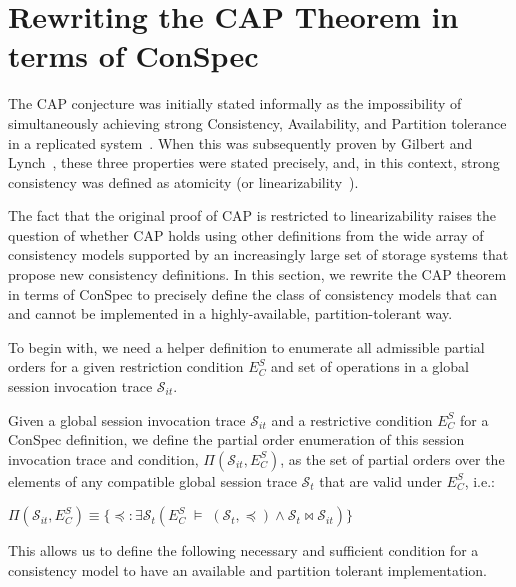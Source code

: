 \documentclass[journal,compsoc]{IEEEtran}
\begin{document}
\section{Rewriting the CAP Theorem in terms of ConSpec}\label{sec:cap}
The CAP conjecture was initially stated informally as the impossibility of simultaneously achieving strong Consistency, Availability, and Partition tolerance in a replicated system~\cite{brew:cap}. When this was subsequently proven by Gilbert and Lynch~\cite{Gilbert:2002:BCF:564585.564601}, these three properties were stated precisely, and, in this context, strong consistency was defined as atomicity (or linearizability~\cite{Herlihy:1990:LCC:78969.78972}).

The fact that the original proof of CAP is restricted to linearizability raises the question of whether CAP holds using other definitions from
 the wide array of consistency models supported by an increasingly large set of storage systems that propose new consistency definitions.
 In this section, we rewrite the CAP theorem in terms of ConSpec to precisely define the class of consistency models that can and cannot be implemented in a highly-available, partition-tolerant way.




To begin with, we need a helper definition to enumerate all admissible partial orders for a given restriction condition $E^S_C$ and set of operations in a global session invocation trace $\mathcal{S}_{it}$.

\begin{definition} \label{def:allpos}
Given a global session invocation trace $\mathcal{S}_{it}$ and a restrictive condition $E^S_C$
for a ConSpec definition, we define the partial order enumeration
of this session invocation trace and condition, $\Pi(\mathcal{S}_{it},E^S_C)$, as
the set of partial orders over the elements of any compatible global session trace $\mathcal{S}_{t}$ that are valid
under $E^S_C$, i.e.:


$\Pi(\mathcal{S}_{it},E^S_C) \equiv  \{\preccurlyeq: \exists \mathcal{S}_{t} \left(  E^S_C\; \vDash \; \left( {\mathcal{S}_{t}}, \preccurlyeq \right) \wedge \mathcal{S}_{t}\bowtie \mathcal{S}_{it} \right) \}$
\end{definition}

This allows us to define the following necessary and sufficient condition
for a consistency model to have an available and partition tolerant
implementation.
\end{document}
